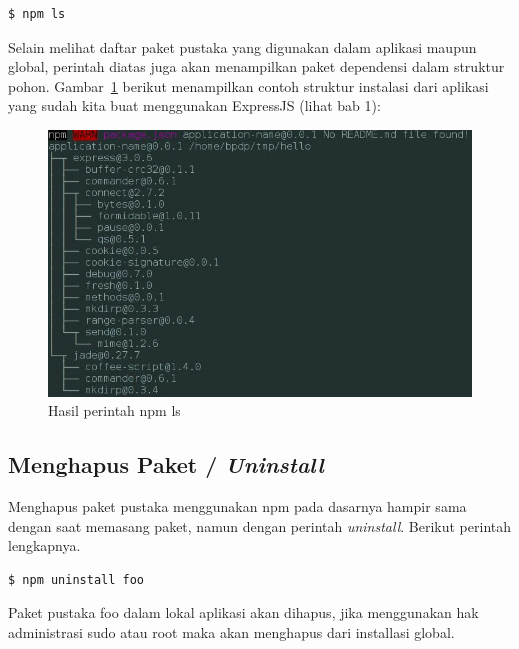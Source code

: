 \lstset{language=bash,caption=Argumen npm untuk melihat daftar paket terpasang}
\begin{lstlisting}
$ npm ls
\end{lstlisting}

Selain melihat daftar paket pustaka yang digunakan dalam aplikasi maupun global, perintah diatas juga akan menampilkan paket dependensi dalam struktur pohon. Gambar~\ref{fig:npmls} berikut menampilkan contoh struktur instalasi dari aplikasi yang sudah kita buat menggunakan ExpressJS (lihat bab 1):

  \begin{figure}
    \begin{center}
      \includegraphics[scale=0.5]{images/npmls.jpg}
    \end{center}
    \caption{Hasil perintah npm ls}
    \label{fig:npmls}
  \end{figure}

\subsection{Menghapus Paket / \textit{Uninstall}}

Menghapus paket pustaka menggunakan npm pada dasarnya hampir sama dengan saat memasang paket, namun dengan perintah \textit{uninstall}. Berikut perintah lengkapnya.

\lstset{language=bash,caption=Perintah menghapus paket di npm}
\begin{lstlisting}
$ npm uninstall foo
\end{lstlisting}

Paket pustaka foo dalam lokal aplikasi akan dihapus, jika menggunakan hak administrasi sudo atau root maka akan menghapus dari installasi global.

